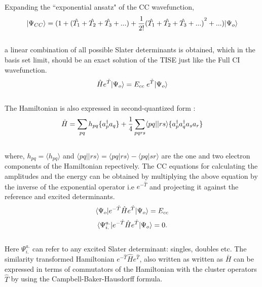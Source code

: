 Expanding the ``exponential ansatz" of the CC wavefunction,
\\
\begin{equation}
| \Psi_{CC} \rangle = (1+(\hat{T_1} + \hat{T_2} + \hat{T_3} + ... ) + \frac{1}{2!}{(\hat{T_1} + \hat{T_2} + \hat{T_3} + ...)}^2 + ... )| \Psi_o \rangle
\end{equation}
\\
a linear combination of all possible Slater determinants is obtained, which in the basis set limit,  
should be an exact solution of the TISE just like the Full CI wavefunction. 
\\
\begin{equation}
\hat{H}e^{\hat{T}}| \Psi_o \rangle = E_{cc}\;e^{\hat{T}}| \Psi_o \rangle
\end{equation}
\\
The Hamiltonian is also expressed in second-quantized form \cite{Crawford00}:
\\
\begin{equation}
\hat{H} = \sum_{pq}h_{pq}\{a^\dagger_pa_q\} + \frac{1}{4}\sum_{pqrs}\langle pq || rs \rangle\{a^\dagger_pa^\dagger_qa_sa_r\}
\end{equation}
\\
where, $h_{pq} = \langle h_{pq} \rangle$ and $\langle pq||rs \rangle = \langle pq|rs \rangle - \langle pq|sr \rangle$ are the one and two electron components of the Hamiltonian repectively.
The CC equations for calculating the amplitudes and the energy can be  
obtained by multiplying the above equation by the inverse of the exponential operator i.e
$e^{-\hat{T}}$ and projecting it against the reference and excited
determinants.
\\
\begin {equation}
\langle \Psi_o |e^{-\hat{T}}\hat{H}e^{\hat{T}}| \Psi_o \rangle = E_{cc}
\end{equation}
\begin{equation}
\langle \Psi^{a.}_{i.} |e^{-\hat{T}}\hat{H}e^{\hat{T}}| \Psi_o \rangle = 0 .
\end{equation} 
\\
Here $\Psi^{a.}_{i.}$ can refer to any excited Slater determinant: singles, doubles etc. 
The similarity transformed Hamiltonian $e^{-\hat{T}}\hat{H}e^{\hat{T}}$, also written as 
written as $\bar{H}$ can be expressed in terms of commutators of the Hamiltonian with the 
cluster operators $\hat{T}$ by using the Campbell-Baker-Hausdorff formula\cite{Merzbacher70}.
